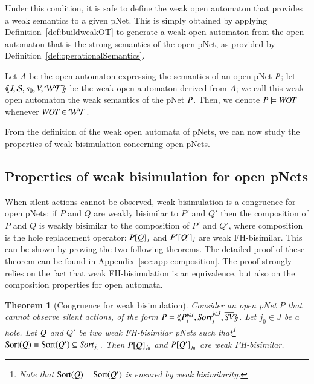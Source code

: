\documentclass{elsarticle}
\newtheorem{thm}{Theorem}
\begin{document}
Under this condition, it is safe to define the weak open automaton that provides a weak semantics to a given pNet. This is simply obtained by applying Definition~\ref{def:buildweakOT} to generate a weak open automaton from the open automaton that is the strong semantics of the open pNet, as provided by Definition~\ref{def:operationalSemantics}.

\begin{definition}
Let $A$ be the open automaton expressing the semantics of an open pNet $P$; let $\langle\hspace{-0.45ex}\langle J,\mathcal{S},s_0, V, \mathcal{WT}\rangle\hspace{-0.45ex}\rangle$ be the weak open automaton derived from $A$; we call this weak open automaton the weak semantics of the pNet $P$. Then, we denote $\pNet \models \WOT$ whenever $\WOT\in\WT$.
\end{definition}

From the definition of the weak open automata of pNets, we can now study the properties of weak bisimulation concerning open pNets.


\subsection{Properties of weak bisimulation for open pNets}

When silent actions cannot be observed, weak bisimulation is a congruence for open pNets: if $P$ and $Q$ are weakly bisimilar to $P'$ and $Q'$ then the composition of $P$ and $Q$ is weakly bisimilar to the composition of $P'$ and $Q'$, where composition is the hole replacement operator: 	$P[Q]_{j}$ and 
	$P'[Q']_{j}$ are weak FH-bisimilar. This can be shown by proving the two following theorems.
The detailed proof of these theorem can be found in Appendix~\ref{sec:app-composition}. The proof strongly relies on the fact that weak FH-bisimulation is an equivalence, but also on the composition properties for open automata.

\begin{thm}[Congruence for  weak bisimulation]\label{weak-thm-congr-eq}
	Consider an open pNet $P$
 that cannot observe silent actions, of the form 	$\pNet = \mylangle \pNet_i^{i\in I}, \Sort_j^{j\in J}, 
	\set{\symb{SV}}\myrangle$.
	Let $j_0\in J$ be a hole. Let $Q$ and $Q'$ be two weak FH-bisimilar pNets such that\footnote{Note that $\operatorname{Sort}(Q)=\operatorname{Sort}(Q')$ is 
	ensured by 
	weak bisimilarity.} 
	$\Sortop(\pNetQ)=\Sortop(\pNetQ')\subseteq\Sort_{j_0}$. Then 
	$P[Q]_{j_0}$ and 
	$P[Q']_{j_0}$ are weak FH-bisimilar.
\end{thm}
\end{document}
